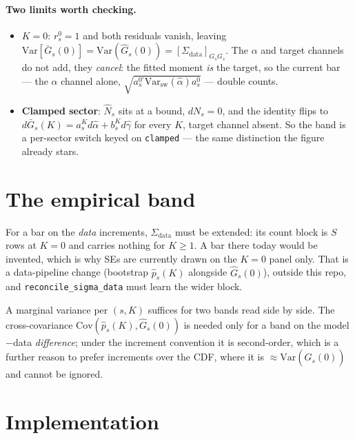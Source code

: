 \documentclass[11pt]{article}
\newcommand{\Gbar}{\bar{G}}
\newcommand{\Ghat}{\hat{G}}
\newcommand{\ahat}{\hat{\alpha}}
\newcommand{\ghat}{\hat{\gamma}}
\newcommand{\Nhat}{\hat{N}}
\begin{document}
\paragraph{Two limits worth checking.}
\begin{itemize}
\item $K=0$: $r_s^{0}=1$ and both residuals vanish, leaving
$\mathrm{Var}[\Gbar_s(0)]=\mathrm{Var}(\Ghat_s(0))=[\Sigma_{\mathrm{data}}]_{G_sG_s}$. The
$\alpha$ and target channels do not add, they \emph{cancel}: the fitted moment \emph{is} the
target, so the current bar --- the $\alpha$ channel alone,
$\sqrt{a_s^{0\prime}\mathrm{Var}_{\mathrm{sw}}(\ahat)a_s^{0}}$ --- double counts.
\item \textbf{Clamped sector}: $\Nhat_s$ sits at a bound, $dN_s=0$, and the identity flips to
$d\Gbar_s(K)=a_s^{K}d\ahat+b_s^{K}d\ghat$ for every $K$, target channel absent. So the band
is a per-sector switch keyed on \texttt{clamped} --- the same distinction the figure already
stars.
\end{itemize}

\section{The empirical band}

For a bar on the \emph{data} increments, $\Sigma_{\mathrm{data}}$ must be extended: its count
block is $S$ rows at $K=0$ and carries nothing for $K\ge1$. A bar there today would be
invented, which is why SEs are currently drawn on the $K=0$ panel only. That is a
data-pipeline change (bootstrap $\hat p_s(K)$ alongside $\Ghat_s(0)$), outside this repo, and
\texttt{reconcile\_sigma\_data} must learn the wider block.

A marginal variance per $(s,K)$ suffices for two bands read side by side. The cross-covariance
$\mathrm{Cov}(\hat p_s(K),\Ghat_s(0))$ is needed only for a band on the model$-$data
\emph{difference}; under the increment convention it is second-order, which is a further
reason to prefer increments over the CDF, where it is $\approx\mathrm{Var}(\Ghat_s(0))$ and
cannot be ignored.

\section{Implementation}
\end{document}
